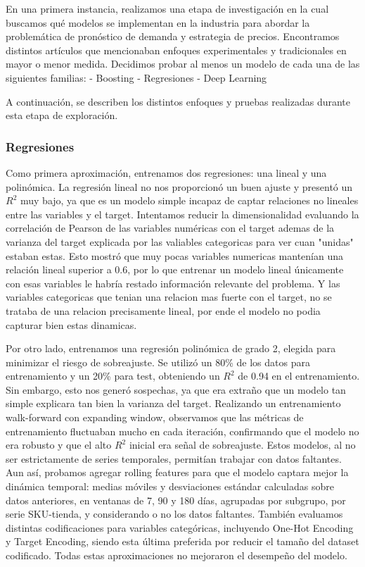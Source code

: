 \documentclass[12pt,a4paper]{article}
\begin{document}
    En una primera instancia, realizamos una etapa de investigación en la cual buscamos qué modelos se implementan en la industria para abordar la problemática de pronóstico de demanda y estrategia de precios. Encontramos distintos artículos que mencionaban enfoques experimentales y tradicionales en mayor o menor medida. Decidimos probar al menos un modelo de cada una de las siguientes familias:
    - Boosting
    - Regresiones
    - Deep Learning

    A continuación, se describen los distintos enfoques y pruebas realizadas durante esta etapa de exploración.

        \subsubsection{Regresiones}

        Como primera aproximación, entrenamos dos regresiones: una lineal y una polinómica. La regresión lineal no nos proporcionó un buen ajuste y presentó un $R^2$  muy bajo, ya que es un modelo simple incapaz de captar relaciones no lineales entre las variables y el target. 
        Intentamos reducir la dimensionalidad evaluando la correlación de Pearson de las variables numéricas con el target ademas de la varianza del target explicada por las valiables categoricas para ver cuan "unidas" estaban estas. Esto mostró que muy pocas variables numericas mantenían una relación lineal superior a 0.6, por lo que entrenar un modelo lineal únicamente con esas variables le habría restado información relevante del problema.
        Y las variables categoricas que tenian una relacion mas fuerte con el target, no se trataba de una relacion precisamente lineal, por ende el modelo no podia capturar bien estas dinamicas.

        \vspace{0.2cm}

        Por otro lado, entrenamos una regresión polinómica de grado 2, elegida para minimizar el riesgo de sobreajuste. Se utilizó un 80\% de los datos para entrenamiento y un 20\% para test, obteniendo un $R^2$  de 0.94 en el entrenamiento. Sin embargo, esto nos generó sospechas, ya que era extraño que un modelo tan simple explicara tan bien la varianza del target.  
        Realizando un entrenamiento walk-forward con expanding window, observamos que las métricas de entrenamiento fluctuaban mucho en cada iteración, confirmando que el modelo no era robusto y que el alto $R^2$  inicial era señal de sobreajuste.
        Estos modelos, al no ser estrictamente de series temporales, permitían trabajar con datos faltantes. Aun así, probamos agregar rolling features para que el modelo captara mejor la dinámica temporal: medias móviles y desviaciones estándar calculadas sobre datos anteriores, en ventanas de 7, 90 y 180 días, agrupadas por subgrupo, por serie SKU-tienda, y considerando o no los datos faltantes.  
        También evaluamos distintas codificaciones para variables categóricas, incluyendo One-Hot Encoding y Target Encoding, siendo esta última preferida por reducir el tamaño del dataset codificado. Todas estas aproximaciones no mejoraron el desempeño del modelo.
\end{document}
